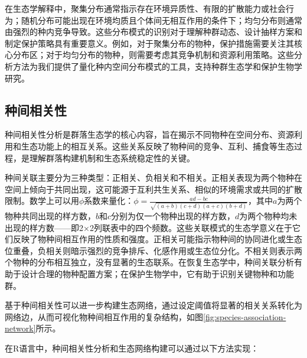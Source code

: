 \documentclass[
  twoside,12pt,fontset=none]{ctexbook}
\begin{document}
在生态学解释中，聚集分布通常指示存在环境异质性、有限的扩散能力或社会行为；随机分布可能出现在环境均质且个体间无相互作用的条件下；均匀分布则通常由强烈的种内竞争导致。这些分布模式的识别对于理解种群动态、设计抽样方案和制定保护策略具有重要意义。例如，对于聚集分布的物种，保护措施需要关注其核心分布区；对于均匀分布的物种，则需要考虑其竞争机制和资源利用策略。这些分析方法为我们提供了量化种内空间分布模式的工具，支持种群生态学和保护生物学研究。

\hypertarget{ux79cdux95f4ux76f8ux5173ux6027}{%
\subsection{种间相关性}\label{ux79cdux95f4ux76f8ux5173ux6027}}

种间相关性分析是群落生态学的核心内容，旨在揭示不同物种在空间分布、资源利用和生态功能上的相互关系。这些关系反映了物种间的竞争、互利、捕食等生态过程，是理解群落构建机制和生态系统稳定性的关键。

种间关联主要分为三种类型：正相关、负相关和不相关。正相关表现为两个物种在空间上倾向于共同出现，这可能源于互利共生关系、相似的环境需求或共同的扩散限制。数学上可以用\(\phi\)系数来量化：\(\phi = \frac{ad-bc}{\sqrt{(a+b)(c+d)(a+c)(b+d)}}\)，其中\(a\)为两个物种共同出现的样方数，\(b\)和\(c\)分别为仅一个物种出现的样方数，\(d\)为两个物种均未出现的样方数------即2×2列联表中的四个频数。这些关联模式的生态学意义在于它们反映了物种间相互作用的性质和强度。正相关可能指示物种间的协同进化或生态位重叠，负相关则暗示强烈的竞争排斥、化感作用或生态位分化。不相关则表示两个物种的分布相互独立，没有显著的生态联系。在恢复生态学中，种间关联分析有助于设计合理的物种配置方案；在保护生物学中，它有助于识别关键物种和功能群。

基于种间相关性可以进一步构建生态网络，通过设定阈值将显著的相关关系转化为网络边，从而可视化物种间相互作用的复杂结构，如图\ref{fig:species-association-network}所示。

在R语言中，种间相关性分析和生态网络构建可以通过以下方法实现：
\end{document}
